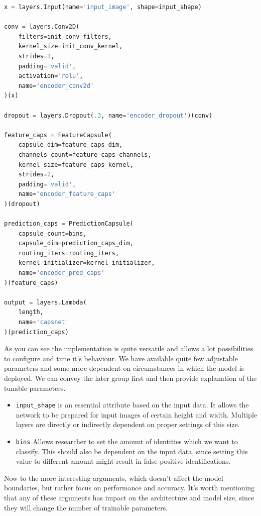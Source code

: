 \begin{lstlisting}[language=Python, caption=Features capsule with squash activation]
x = layers.Input(name='input_image', shape=input_shape)

conv = layers.Conv2D(
    filters=init_conv_filters,
    kernel_size=init_conv_kernel,
    strides=1,
    padding='valid',
    activation='relu',
    name='encoder_conv2d'
)(x)

dropout = layers.Dropout(.3, name='encoder_dropout')(conv)

feature_caps = FeatureCapsule(
    capsule_dim=feature_caps_dim,
    channels_count=feature_caps_channels,
    kernel_size=feature_caps_kernel,
    strides=2,
    padding='valid',
    name='encoder_feature_caps'
)(dropout)

prediction_caps = PredictionCapsule(
    capsule_count=bins,
    capsule_dim=prediction_caps_dim,
    routing_iters=routing_iters,
    kernel_initializer=kernel_initializer,
    name='encoder_pred_caps'
)(feature_caps)

output = layers.Lambda(
    length,
    name='capsnet'
)(prediction_caps)
\end{lstlisting}

As you can see the implementation is quite versatile and allows a lot possibilities to configure and tune it's behaviour. We have available quite few adjustable parameters and some more dependent on circumstances in which the model is deployed. We can convey the later group first and then provide explanation of the tunable parameters.

\begin{itemize}
    \item \texttt{input\_shape} is an essential attribute based on the input data. It allows the network to be prepared for input images of certain height and width. Multiple layers are directly or indirectly dependent on proper settings of this size.
    \item \texttt{bins} Allows researcher to set the amount of identities which we want to classify. This should also be dependent on the input data, since setting this value to different amount might result in false positive identifications.
\end{itemize}

Now to the more interesting arguments, which doesn't affect the model boundaries, but rather focus on performance and accuracy. It's worth mentioning that any of these arguments has impact on the architecture and model size, since they will change the number of trainable parameters.


